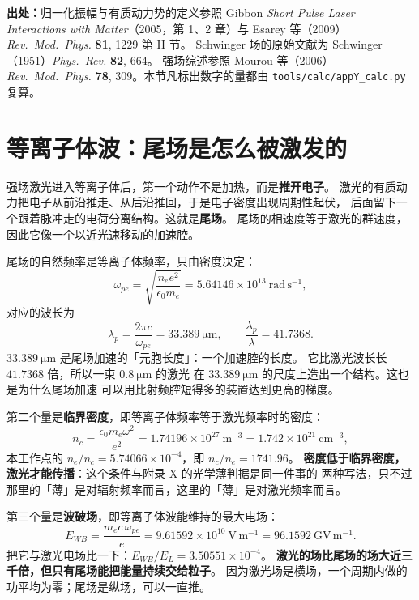 {\footnotesize
\textbf{出处：}归一化振幅与有质动力势的定义参照 Gibbon \emph{Short Pulse Laser
Interactions with Matter}（2005，第 1、2 章）与 Esarey 等（2009）
\emph{Rev.\ Mod.\ Phys.} \textbf{81}, 1229 第 II 节。
Schwinger 场的原始文献为
Schwinger（1951）\emph{Phys.\ Rev.} \textbf{82}, 664。
强场综述参照 Mourou 等（2006）
\emph{Rev.\ Mod.\ Phys.} \textbf{78}, 309。本节凡标出数字的量都由
\texttt{tools/\allowbreak{}calc/\allowbreak{}appY\_calc.py} 复算。
}

\section{等离子体波：尾场是怎么被激发的}
\label{sec:app-y-wake}

强场激光进入等离子体后，第一个动作不是加热，而是\textbf{推开电子}。
激光的有质动力把电子从前沿推走、从后沿推回，于是电子密度出现周期性起伏，
后面留下一个跟着脉冲走的电荷分离结构。这就是\textbf{尾场}。
尾场的相速度等于激光的群速度，因此它像一个以近光速移动的加速腔。

尾场的自然频率是等离子体频率，只由密度决定：
\begin{equation}
\omega_{pe} = \sqrt{\frac{n_e e^2}{\epsilon_0 m_e}}
= 5.64146\times10^{13}\ \mathrm{rad\,s^{-1}},
\label{eq:app-y-omegape}
\end{equation}
对应的波长为
\begin{equation}
\lambda_p = \frac{2\pi c}{\omega_{pe}} = 33.389\ \mathrm{\mu m},
\qquad
\frac{\lambda_p}{\lambda} = 41.7368.
\label{eq:app-y-lamp}
\end{equation}
$33.389\ \mathrm{\mu m}$ 是尾场加速的「元胞长度」：一个加速腔的长度。
它比激光波长长 $41.7368$ 倍，所以一束 $0.8\ \mathrm{\mu m}$ 的激光
在 $33.389\ \mathrm{\mu m}$ 的尺度上造出一个结构。这也是为什么尾场加速
可以用比射频腔短得多的装置达到更高的梯度。

第二个量是\textbf{临界密度}，即等离子体频率等于激光频率时的密度：
\begin{equation}
n_c = \frac{\epsilon_0 m_e \omega^2}{e^2} = 1.74196\times10^{27}\ \mathrm{m^{-3}}
= 1.742\times10^{21}\ \mathrm{cm^{-3}},
\label{eq:app-y-nc}
\end{equation}
本工作点的 $n_e/n_c = 5.74066\times10^{-4}$，即 $n_c/n_e = 1741.96$。
\textbf{密度低于临界密度，激光才能传播}：这个条件与附录 X 的光学薄判据是同一件事的
两种写法，只不过那里的「薄」是对辐射频率而言，这里的「薄」是对激光频率而言。

第三个量是\textbf{波破场}，即等离子体波能维持的最大电场：
\begin{equation}
E_{WB} = \frac{m_e c\,\omega_{pe}}{e} = 9.61592\times10^{10}\ \mathrm{V\,m^{-1}}
= 96.1592\ \mathrm{GV\,m^{-1}}.
\label{eq:app-y-ewb}
\end{equation}
把它与激光电场比一下：$E_{WB}/E_L = 3.50551\times10^{-4}$。
\textbf{激光的场比尾场的场大近三千倍，但只有尾场能把能量持续交给粒子}。
因为激光场是横场，一个周期内做的功平均为零；尾场是纵场，可以一直推。

